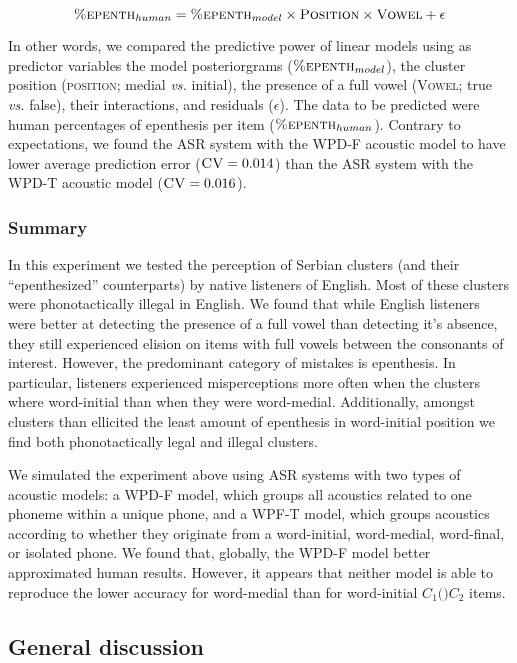 {  \begin{equation}
    \textsc{\%epenth}_{human} = \textsc{\%epenth}_{model} \times \textsc{Position} \times \textsc{Vowel} + \epsilon
  \end{equation}

  In other words, we compared the predictive power of linear models using as predictor variables the model posteriorgrams ($\textsc{\%epenth}_{model}$), the cluster position (\textsc{position}; medial \textit{vs.} initial), the presence of a full vowel (\textsc{Vowel}; true \textit{vs.} false), their interactions, and residuals ($\epsilon$). The data to be predicted were human percentages of epenthesis per item ($\textsc{\%epenth}_{human}$).
  Contrary to expectations, we found the ASR system with the WPD-F acoustic model to have lower average prediction error ($\textsc{CV} = 0.014$) than the ASR system with the WPD-T acoustic model ($\textsc{CV} = 0.016$).
  
\subsubsection{Summary}
In this experiment we tested the perception of Serbian clusters (and their ``epenthesized'' counterparts) by native listeners of English. Most of these clusters were phonotactically illegal in English. We found that while English listeners were better at detecting the presence of a full vowel than detecting it's absence, they still experienced elision on items with full vowels between the consonants of interest. However, the predominant category of mistakes is epenthesis. In particular, listeners experienced misperceptions more often when the clusters where word-initial than when they were word-medial. Additionally, amongst clusters than ellicited the least amount of epenthesis in word-initial position we find both phonotactically legal and illegal clusters.

We simulated the experiment above using ASR systems with two types of acoustic models: a WPD-F model, which groups all acoustics related to one phoneme within a unique phone, and a WPF-T model, which groups acoustics according to whether they originate from a word-initial, word-medial, word-final, or isolated phone.
We found that, globally, the WPD-F model better approximated human results. However, it appears that neither model is able to reproduce the lower accuracy for word-medial than for word-initial $C_{1}($\textipa{[@]}$)C_{2}$ items.
  
\subsection{General discussion}

}
